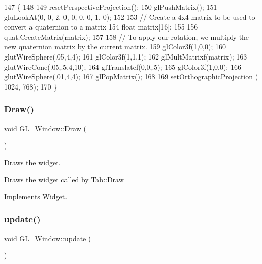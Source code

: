 \begin{DoxyCode}
147 \{
148 
149     resetPerspectiveProjection();
150     glPushMatrix();
151     gluLookAt(0, 0, 2,  0, 0, 0,   0, 1, 0);
152 
153     \textcolor{comment}{// Create a 4x4 matrix to be used to convert a quaternion to a matrix}
154     \textcolor{keywordtype}{float} matrix[16];
155 
156     quat.CreateMatrix(matrix);
157 
158     \textcolor{comment}{// To apply our rotation, we multiply the new quaternion matrix by the current matrix.}
159     glColor3f(1,0,0);
160     glutWireSphere(.05,4,4);
161     glColor3f(1,1,1);
162     glMultMatrixf(matrix);
163     glutWireCone(.05,.5,4,10);
164     glTranslatef(0,0,.5);
165     glColor3f(1,0,0);
166     glutWireSphere(.01,4,4);
167     glPopMatrix();
168 
169     setOrthographicProjection ( 1024, 768);
170 \}
\end{DoxyCode}
\mbox{\label{class_g_l___window_a0065950273a11cddec75d1a4d2cf723e}} 
\subsubsection{\texorpdfstring{Draw()}{Draw()}\hspace{0.1cm}{\footnotesize\ttfamily [2/2]}}
{\footnotesize\ttfamily void G\+L\+\_\+\+Window\+::\+Draw (\begin{DoxyParamCaption}{ }\end{DoxyParamCaption})\hspace{0.3cm}{\ttfamily [virtual]}}



Draws the widget. 

Draws the widget called by \hyperlink{class_tab_ae9db0c3ae8b0b75f7c5b3493b0267482}{Tab\+::\+Draw} 

Implements \hyperlink{class_widget_ac4c2063cd671468ad05d84cfe963c032}{Widget}.

\mbox{\label{class_g_l___window_a34eab971f586b7d383d05475195bc462}} 
\subsubsection{\texorpdfstring{update()}{update()}\hspace{0.1cm}{\footnotesize\ttfamily [1/2]}}
{\footnotesize\ttfamily void G\+L\+\_\+\+Window\+::update (\begin{DoxyParamCaption}{ }\end{DoxyParamCaption})\hspace{0.3cm}{\ttfamily [virtual]}}



